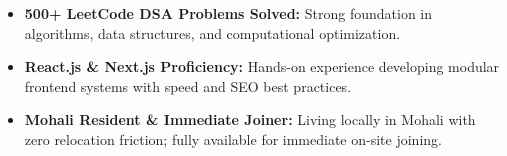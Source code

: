 \documentclass[a4paper,10pt]{article}
\begin{document}
\begin{itemize}

    \item \textbf{500+ LeetCode DSA Problems Solved:} Strong foundation in algorithms, data structures, and computational optimization.

    \item \textbf{React.js \& Next.js Proficiency:} Hands-on experience developing modular frontend systems with speed and SEO best practices.

    \item \textbf{Mohali Resident \& Immediate Joiner:} Living locally in Mohali with zero relocation friction; fully available for immediate on-site joining.

\end{itemize}

\end{document}
